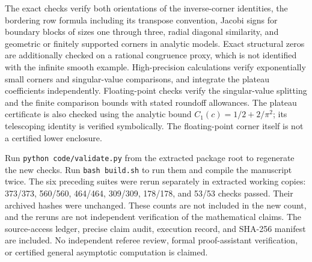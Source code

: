 \documentclass[11pt]{article}
\theoremstyle{definition}
\begin{document}
The exact checks verify both orientations of the inverse-corner identities, the bordering row formula including its transpose convention, Jacobi signs for boundary blocks of sizes one through three, radial diagonal similarity, and geometric or finitely supported corners in analytic models. Exact structural zeros are additionally checked on a rational congruence proxy, which is not identified with the infinite smooth example. High-precision calculations verify exponentially small corners and singular-value comparisons, and integrate the plateau coefficients independently. Floating-point checks verify the singular-value splitting and the finite comparison bounds with stated roundoff allowances. The plateau certificate is also checked using the analytic bound $C_1(c)=1/2+2/\pi^2$; its telescoping identity is verified symbolically. The floating-point corner itself is not a certified lower enclosure.

\begin{table}[ht]
\centering

\caption{Diagnostics for the actual plateau symbol \eqref{eq:plateau}, using its exact coefficient formula. The theorem guarantees a canonical subsequence, not that this table proves full convergence. No least-singular-value logarithm near floating-point zero is used as a proof.}
\end{table}

Run \texttt{python code/validate.py} from the extracted package root to regenerate the new checks. Run \texttt{bash build.sh} to run them and compile the manuscript twice. The six preceding suites were rerun separately in extracted working copies: 373/373, 560/560, 464/464, 309/309, 178/178, and 53/53 checks passed. Their archived hashes were unchanged. These counts are not included in the new count, and the reruns are not independent verification of the mathematical claims. The source-access ledger, precise claim audit, execution record, and SHA-256 manifest are included. No independent referee review, formal proof-assistant verification, or certified general asymptotic computation is claimed.

\appendix
\end{document}
